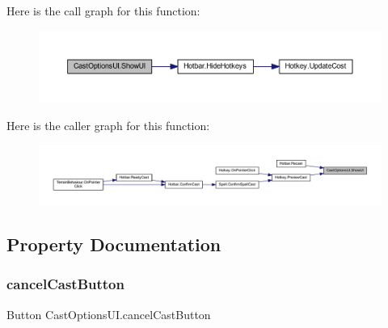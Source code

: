 Here is the call graph for this function\+:\nopagebreak
\begin{figure}[H]
\begin{center}
\leavevmode
\includegraphics[width=350pt]{class_cast_options_u_i_a37c4fa85c666ede5418cd5d7e524ce35_cgraph}
\end{center}
\end{figure}
Here is the caller graph for this function\+:\nopagebreak
\begin{figure}[H]
\begin{center}
\leavevmode
\includegraphics[width=350pt]{class_cast_options_u_i_a37c4fa85c666ede5418cd5d7e524ce35_icgraph}
\end{center}
\end{figure}


\subsection{Property Documentation}
\mbox{\label{class_cast_options_u_i_a88e0c5e435183c0f3912bd9eb5a6629f}} 
\subsubsection{\texorpdfstring{cancelCastButton}{cancelCastButton}}
{\footnotesize\ttfamily Button Cast\+Options\+U\+I.\+cancel\+Cast\+Button\hspace{0.3cm}{\ttfamily [get]}}

